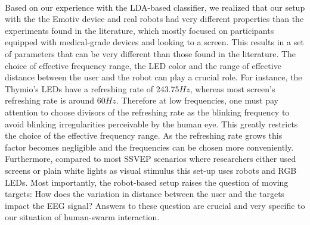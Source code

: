 \documentclass{svmult}
\begin{document}
\\
Based on our experience with the LDA-based classifier, we realized that our setup with the the Emotiv device and real robots had very different properties than the experiments found in the literature, which mostly focused on participants equipped with medical-grade devices and looking to a screen. This results in a set of parameters that can be very different than those found in the literature. 
The choice of effective frequency range, the LED color and the range of effective distance between the user and the robot can play a crucial role. 
For instance, the Thymio's LEDs have a refreshing rate of 243.75$Hz$, whereas most screen's refreshing rate is around 60$Hz$. Therefore at low frequencies, one must pay attention to choose divisors of the refreshing rate as the blinking frequency to avoid blinking irregularities perceivable by the human eye. This greatly restricts the choice of the effective frequency range. As the refreshing rate grows this factor becomes negligible and the frequencies can be chosen more conveniently. Furthermore, compared to most SSVEP scenarios where researchers either used screens or plain white lights as visual stimulus this set-up uses robots and RGB LEDs. Most importantly, the robot-based setup raises the question of moving targets: How does the variation in distance between the user and the targets impact the EEG signal? Answers to these question are crucial and very specific to our situation of human-swarm interaction.
\end{document}
